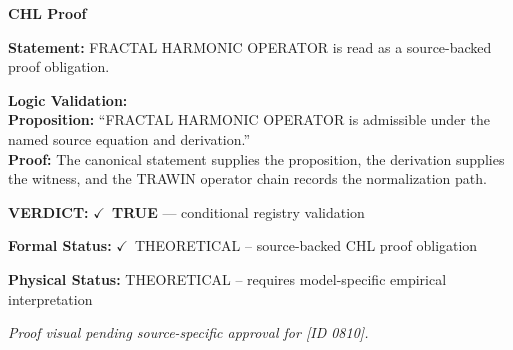 \vspace{0.45em}
\noindent\textbf{CHL Proof}\par
\textbf{Statement:} FRACTAL HARMONIC OPERATOR is read as a source-backed proof obligation.

\textbf{Logic Validation:}\\
\textbf{Proposition:} ``FRACTAL HARMONIC OPERATOR is admissible under the named source equation and derivation.''\\
\textbf{Proof:} The canonical statement supplies the proposition, the derivation supplies the witness, and the TRAWIN operator chain records the normalization path.

\textbf{VERDICT:} \ensuremath{\checkmark}\ \textbf{TRUE} --- conditional registry validation

\textbf{Formal Status:} \ensuremath{\checkmark}\ THEORETICAL -- source-backed CHL proof obligation

\textbf{Physical Status:} THEORETICAL -- requires model-specific empirical interpretation
\par\vspace{0.45em}
\par
\vfill
\begingroup\footnotesize\itshape
Proof visual pending source-specific approval for [ID 0810].
\par\endgroup
\vfill
\endgroup
\endgroup
